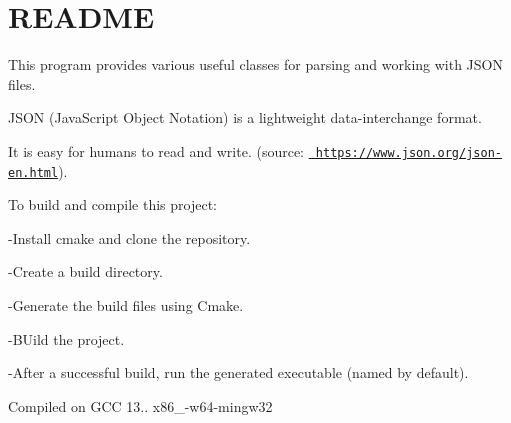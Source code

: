 \chapter{README}
\hypertarget{md__r_e_a_d_m_e}{}\label{md__r_e_a_d_m_e}

\begin{DoxyItemize}
\item This program provides various useful classes for parsing and working with JSON files.
\end{DoxyItemize}

JSON (Java\+Script Object Notation) is a lightweight data-\/interchange format.
\begin{DoxyItemize}
\item It is easy for humans to read and write. (source\+: \href{https://www.json.org/json-en.html}{\texttt{ https\+://www.\+json.\+org/json-\/en.\+html}}).
\item To build and compile this project\+:
\item -\/Install cmake and clone the repository.
\item -\/Create a build directory.
\item -\/Generate the build files using Cmake.
\item -\/BUild the project.
\item -\/After a successful build, run the generated executable (named \textquotesingle{}\textquotesingle{} by default).
\item 
\item Compiled on GCC 13.. x86\+\_-\/w64-\/mingw32 
\end{DoxyItemize}